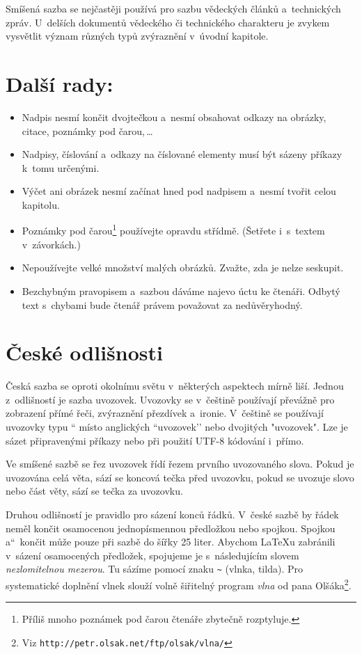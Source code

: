 \documentclass[a4paper, 10 pt, twocolumn]{article}
\newcommand{\myuv}[1]{\quotedblbase #1\textquotedblleft}
\begin{document}
Smíšená sazba se nejčastěji používá pro sazbu vědeckých článků a~technických zpráv. U~delších dokumentů vědeckého či technického charakteru je zvykem vysvětlit význam různých typů zvýraznění v~úvodní kapitole.

\section{Další rady:}
\label{sec:3}
\begin{itemize}
\item Nadpis nesmí končit dvojtečkou a~nesmí obsahovat odkazy na obrázky, citace, poznámky pod čarou,\,\dots
\item Nadpisy, číslování a~odkazy na číslované elementy musí být sázeny příkazy k~tomu určenými.
\item Výčet ani obrázek nesmí začínat hned pod nadpisem a~nesmí tvořit celou kapitolu.
\item Poznámky pod čarou\footnote{Příliš mnoho poznámek pod čarou čtenáře zbytečně rozptyluje.} používejte opravdu střídmě. (Šetřete i~s~textem v~závorkách.)
\item Nepoužívejte velké množství malých obrázků. Zvažte, zda je nelze seskupit.
\item Bezchybným pravopisem a~sazbou dáváme najevo úctu ke čtenáři. Odbytý text s~chybami bude čtenář právem považovat za nedůvěryhodný.
\end{itemize}

\section{České odlišnosti}
Česká sazba se oproti okolnímu světu v~některých aspektech mírně liší. Jednou z~odlišností je sazba uvozovek. Uvozovky se v~češtině používají převážně pro zobrazení přímé řeči, zvýraznění přezdívek a~ironie. V~češtině se používají uvozovky typu \myuv{9966} místo anglických ``uvozovek’’ nebo dvojitých "uvozovek". Lze je sázet připravenými příkazy nebo při použití UTF-8 kódování i~přímo.

Ve smíšené sazbě se řez uvozovek řídí řezem prvního uvozovaného slova. Pokud je uvozována celá věta, sází se koncová tečka před uvozovku, pokud se uvozuje slovo nebo část věty, sází se tečka za uvozovku.

Druhou odlišností je pravidlo pro sázení konců řádků. V~české sazbě by řádek neměl končit osamocenou jednopísmennou předložkou nebo spojkou. Spojkou \myuv{a}~končit může pouze při sazbě do šířky 25 liter. Abychom {\LaTeX}u zabránili v~sázení osamocených předložek, spojujeme je s~následujícím slovem \textit{nezlomitelnou mezerou}. Tu sázíme pomocí znaku \verb|~| (vlnka, tilda). Pro systematické doplnění vlnek slouží volně šiřitelný program \emph{vlna} od pana Olšáka\footnote{Viz \texttt{http://petr.olsak.net/ftp/olsak/vlna/}}.
\end{document}
